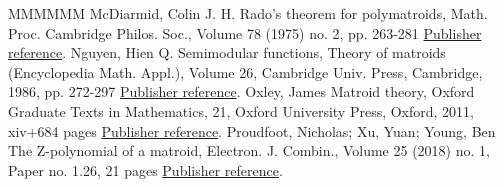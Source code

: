 \documentclass[11pt]{article}
\theoremstyle{definition}
\numberwithin{equation}{section}
\begin{document}
\begin{thebibliography}{MMMMMM}
 McDiarmid, Colin J. H. Rado’s theorem for polymatroids, Math. Proc. Cambridge Philos. Soc., Volume 78 (1975) no. 2, pp. 263-281 \href{https://alco.centre-mersenne.org/articles/10.5802/alco.447/#M75}{Publisher reference}.
 Nguyen, Hien Q. Semimodular functions, Theory of matroids (Encyclopedia Math. Appl.), Volume 26, Cambridge Univ. Press, Cambridge, 1986, pp. 272-297 \href{https://alco.centre-mersenne.org/articles/10.5802/alco.447/#N86}{Publisher reference}.
 Oxley, James Matroid theory, Oxford Graduate Texts in Mathematics, 21, Oxford University Press, Oxford, 2011, xiv+684 pages \href{https://alco.centre-mersenne.org/articles/10.5802/alco.447/#O11}{Publisher reference}.
 Proudfoot, Nicholas; Xu, Yuan; Young, Ben The Z-polynomial of a matroid, Electron. J. Combin., Volume 25 (2018) no. 1, Paper no. 1.26, 21 pages \href{https://alco.centre-mersenne.org/articles/10.5802/alco.447/#Zpoly}{Publisher reference}.
\end{thebibliography}
\end{document}
